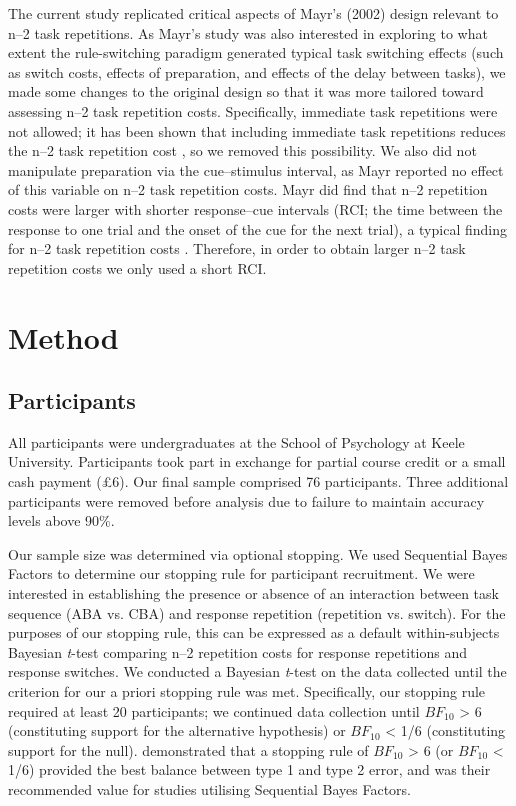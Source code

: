 \documentclass[a4paper, man, natbib]{apa6}
\begin{document}
The current study replicated critical aspects of Mayr's (2002) design relevant to n--2 task repetitions. As Mayr's study was also interested in exploring to what extent the rule-switching paradigm generated typical task switching effects (such as switch costs, effects of preparation, and effects of the delay between tasks), we made some changes to the original design so that it was more tailored toward assessing n--2 task repetition costs. Specifically, immediate task repetitions were not allowed; it has been shown that including immediate task repetitions reduces the n--2 task repetition cost \citep{Philipp2006}, so we removed this possibility. We also did not manipulate preparation via the cue--stimulus interval, as Mayr reported no effect of this variable on n--2 task repetition costs. Mayr did find that n--2 repetition costs were larger with shorter response--cue intervals (RCI; the time between the response to one trial and the onset of the cue for the next trial), a typical finding for n--2 task repetition costs \citep{Gade2005, Grange2009, Mayr2000}. Therefore, in order to obtain larger n--2 task repetition costs we only used a short RCI. 

\section{Method}

\subsection{Participants}
All participants were undergraduates at the School of Psychology at Keele University. Participants took part in exchange for partial course credit or a small cash payment (£6). Our final sample comprised 76 participants. Three additional participants were removed before analysis due to failure to maintain accuracy levels above 90\%.

Our sample size was determined via optional stopping. We used Sequential Bayes Factors \citep{Schoenbrodtinpress} to determine our stopping rule for participant recruitment. We were interested in establishing the presence or absence of an interaction between task sequence (ABA vs. CBA) and response repetition (repetition vs. switch). For the purposes of our stopping rule, this can be expressed as a default within-subjects Bayesian \emph{t}-test \citep{Rouder2009} comparing n--2 repetition costs for response repetitions and response switches.  We conducted a Bayesian \emph{t}-test on the data collected until the criterion for our a priori stopping rule was met. Specifically, our stopping rule required at least 20 participants; we continued data collection until $BF_{10}$ > 6 (constituting support for the alternative hypothesis) or $BF_{10}$ < 1/6 (constituting support for the null). \cite{Schoenbrodtinpress} demonstrated that a stopping rule of $BF_{10}$ > 6 (or $BF_{10}$ < 1/6) provided the best balance between type 1 and type 2 error, and was their recommended value for studies utilising Sequential Bayes Factors. 
\end{document}
